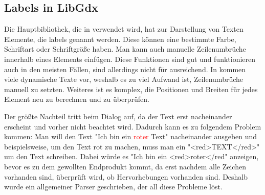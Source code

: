 
\renewcommand{\kapitelautor}{Autor: Felix Zwickelstorfer}
\subsection{Labels in LibGdx}\label{subsec:labels-in-gdx}
\renewcommand{\kapitelautor}{Autor: Felix Zwickelstorfer}

Die Hauptbibliothek, die in \FF verwendet wird, hat zur Darstellung von Texten Elemente, die labels genannt werden.
Diese können eine bestimmte Farbe, Schriftart oder Schriftgröße haben.
Man kann auch manuelle Zeilenumbrüche innerhalb eines Elements einfügen.
Diese Funktionen sind gut und funktionieren auch in den meisten Fällen, sind allerdings nicht für \FF ausreichend.
In \FF kommen viele dynamische Texte vor, weshalb es zu viel Aufwand ist, Zeilenumbrüche manuell zu setzten.
Weiteres ist es komplex, die Positionen und Breiten für jedes Element neu zu berechnen und zu überprüfen.

Der größte Nachteil tritt beim Dialog auf, da der Text erst nacheinander erscheint und vorher nicht beachtet wird.
Dadurch kann es zu folgendem Problem kommen:
Man will den Text "Ich bin ein \textcolor{red}{roter} Text" nacheinander ausgeben und beispielsweise, um den Text rot zu machen, muss man ein "<red>TEXT</red>" um den Text schreiben.
Dabei würde es "Ich bin ein <red>roter</red" anzeigen, bevor es zu dem gewollten Endprodukt kommt, da erst nachdem alle Zeichen vorhanden sind, überprüft wird, ob Hervorhebungen vorhanden sind.
Deshalb wurde ein allgemeiner Parser geschrieben, der all diese Probleme löst.